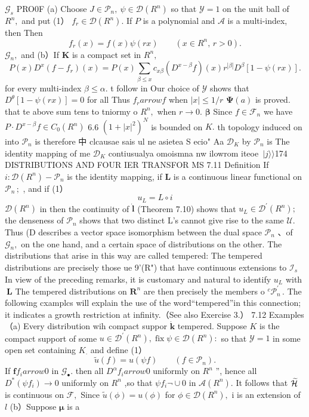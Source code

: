 ${\mathcal{G}}_{s}$ PRO0F (a) Choose $J\in\mathcal{P}_{n},\ \psi\in\mathcal{D}(R^{n})$ so that ${\mathcal{Y}}=1$ on the unit ball of $\textstyle R^{n},$ and put (1） $f_{r}\in{\mathcal{D}}(R^{n}).$ If $\boldsymbol{\mathit{P}}$ is a polynomial and $\textstyle{\mathcal{A}}$ is a multi-index, then Then $$ f_{r}(x)=f(x)\psi(r x)\qquad(x\in R^{n},\,r>0). $$ ${\mathcal{G}}_{n},$ and (b）If $\boldsymbol{K}$ is a compact set in $\textstyle R^{n}\!,$ $$ P(x)D^{x}(f-f_{r})(x)=P(x)\sum_{\beta\leq x}c_{x\beta}(D^{x-\beta}f)(x)r^{|\beta|}D^{\beta}[1-\psi(r x)]. $$ for every multi-index $\beta\leq\alpha.$ t follow in Our choice of $\mathcal{Y}$ shows that $D^{\theta}[1-\psi(r x)]=0$ for all Thus $f_{r} arrow f$ when $|x|\leq1/r$ $\mathbf{\Psi}(a)$ is proved. that te above sum tens to tniormy o $R^{n},$ when $r\to0.$ $\boldsymbol{\beta}$ Since $f\in{\mathcal{F}}_{n}$ we have $P\cdot D^{x-\beta}f\in C_{0}(R^{n})$ 6.6 $(1+|x|^{2})^{N}$ is bounded on $K.$ th topology induced on into ${\mathcal{P}}_{n}$ is therefore 中 clcausae sais ul ne asietea S ecio" Aa ${\mathcal{D}}_{K}$ by ${\mathcal{P}}_{n}$ is The identity mapping of me ${\mathcal{D}}_{K}$ contiusualya omoismna nw ilowrom iteoe $\,|j\rangle\!\rangle$174 DISTRIBUTIONS AND FOUR IER TRANSFOR MS 7.11 Definition If $i:{\mathcal{D}}(R^{n})-{\mathcal{P}}_{n}$ is the identity mapping, if ${\boldsymbol{L}}$ is a continuous linear functional on ${\mathcal{P}}_{n}\,;$ , and if (1） $$ u_{L}=L\circ i $$ ${\mathcal{D}}(R^{n})$ in then the continuity of $\dot{\boldsymbol{l}}$ (Theorem 7.10) shows that $u_{L}\in\mathcal{D}^{\prime}(R^{n});$ the denseness of ${\mathcal{P}}_{n}$ shows that two distinct L's cannot give rise to the same ${\mathcal{U}}.$ Thus (D describes a vector space isomorphism between the dual space ${\mathcal{P}}_{n}$ 、of ${\mathcal{G}}_{n},$ on the one hand, and a certain space of distributions on the other. The distributions that arise in this way are called tempered: The tempered distributions are precisely those ue 9'(R") that have continuous extensions to ${\mathcal{I}}_{s}$ In view of the preceding remarks, it is customary and natural to identify $\textstyle u_{L}$ with $\boldsymbol{\ L}$ The tempered distributions on ${\boldsymbol{R}}^{n}$ are then precisely the members o ${}^{c}{\mathcal{P}}_{n}^{\prime}\,.$ The following cxamplcs will explain the use of the word“tempered”in this connection; it indicates a growth restriction at infinity.（See also Exercise 3.） 7.12 Examples（a) Every distribution wih compact suppor $\dot{\boldsymbol{k}}$ tempered. Suppose $\textstyle K$ is the compact support of some $u\in{\mathcal{D}}^{\prime}(R^{n}),\operatorname{fix}\psi\in{\mathcal{D}}(R^{n}):$ so that ${\mathcal{Y}}=1$ in some open set containing $K_{\!\cdot\!}$ and define (1） $$ \tilde{u}(f)=u(\psi f)\qquad(f\in{\mathcal P}_{n}). $$ If $\mathbf{f}f_{i} arrow0$ in ${\mathcal{G}}_{\bullet}.$ then all $D^{\alpha}f_{i} arrow0$ uniformly on $R^{n}$ ”, hence all $D^{*}(\psi f_{i})\to0$ uniformly on $R^{n}$ ,so that $\psi f_{i}\lnot\cup0$ in ${\mathcal{A}}(R^{n}).$ It follows that $\widetilde{\cal H}$ is continuous on ${\mathcal{F}},$ Since $\tilde{u}(\phi)=u(\phi)$ for $\phi\in{\mathcal{D}}(R^{n}),$ i is an extension of $\boldsymbol{\mathit{l}}$ (b）Suppose $\boldsymbol{\mu}$ is a 